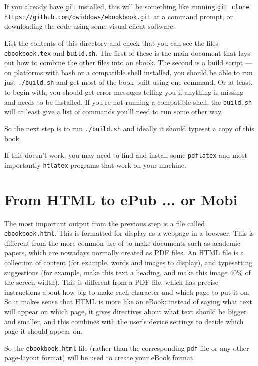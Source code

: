 If you already have \texttt{git} installed, this will be something
like running \texttt{git clone
  https://github.com/dwiddows/ebookbook.git} at a command prompt, or
downloading the code using some visual client software. 

List the contents of this directory and check that you can see the
files \texttt{ebookbook.tex} and \texttt{build.sh}. The first of these
is the main \tex document that lays out how to combine the other files
into an ebook.  The second is a build script --- on platforms with
bash or a compatible shell installed, you should be able to run just
\texttt{./build.sh} and get most of the book built using one
command. Or at least, to begin with, you should get error messages
telling you if anything is missing and needs to be installed. If you're not
running a compatible shell, the \texttt{build.sh} will at least give a list
of commands you'll need to run some other way.

So the next step is to run \texttt{./build.sh} and ideally it should
typeset a copy of this book.

If this doesn't work, you may need to find and install some
\texttt{pdflatex} and most importantly \texttt{htlatex} programs that
work on your machine.

\section{From HTML to ePub ... or Mobi}

The most important output from the previous step is a file called
\texttt{ebookbook.html}.  This is formatted for display as a webpage
in a browser. This is different from the more common use of \tex to
make documents such as academic papers, which are nowadays normally
created as PDF files. An HTML file is a collection of content (for
example, words and images to display), and typesetting suggestions
(for example, make this text a heading, and make this image 40\% of
the screen width). This is different from a PDF file, which has
precise instructions about how big to make each character and which
page to put it on. So it makes sense that HTML is more like an eBook:
instead of saying what text will appear on which page, it gives
directives about what text should be bigger and smaller, and this
combines with the user's device settings to decide which page it
should appear on.

So the \texttt{ebookbook.html} file (rather than the corresponding
\texttt{pdf} file or any other page-layout format) will be used to
create your eBook format. 

